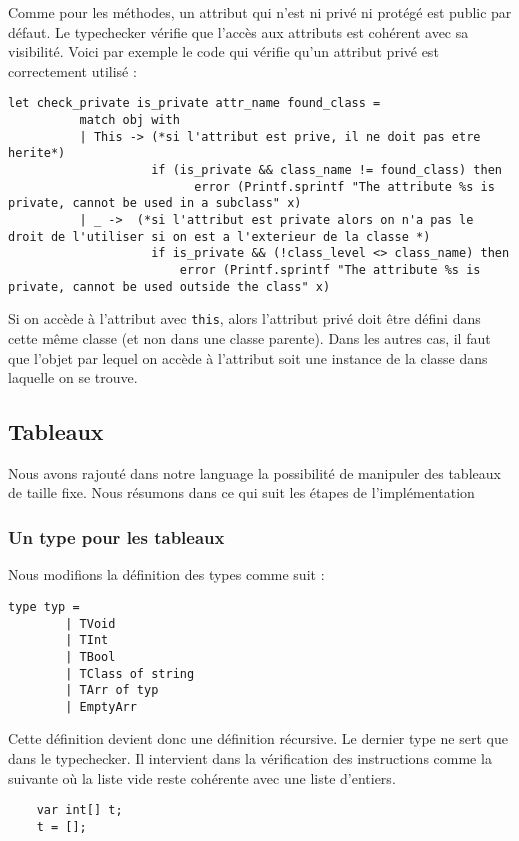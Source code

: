 \documentclass{article}
\begin{document}
Comme pour les méthodes, un attribut qui n'est ni privé ni protégé est public par défaut.
Le typechecker vérifie que l'accès aux attributs est cohérent avec sa visibilité. 
Voici par exemple le code qui vérifie qu'un attribut privé est correctement utilisé : 
\begin{lstlisting}[style=mystyle, language=caml]
    let check_private is_private attr_name found_class = 
          match obj with
          | This -> (*si l'attribut est prive, il ne doit pas etre herite*)
                    if (is_private && class_name != found_class) then 
                          error (Printf.sprintf "The attribute %s is private, cannot be used in a subclass" x)
          | _ ->  (*si l'attribut est private alors on n'a pas le droit de l'utiliser si on est a l'exterieur de la classe *)
                    if is_private && (!class_level <> class_name) then 
                        error (Printf.sprintf "The attribute %s is private, cannot be used outside the class" x)    
\end{lstlisting}
Si on accède à l'attribut avec \texttt{this}, alors l'attribut privé doit être défini dans cette même classe (et non dans une classe parente). Dans les autres cas, il faut que l'objet par lequel on accède à l'attribut soit une instance de la classe dans laquelle on se trouve. 


\subsection{Tableaux}
Nous avons rajouté dans notre language la possibilité de manipuler 
des tableaux de taille fixe. Nous résumons dans ce qui suit les étapes de l'implémentation
\subsubsection{Un type pour les tableaux} 
Nous modifions la définition des types comme suit : 
\begin{lstlisting}[style=mystyle]
    type typ =
        | TVoid
        | TInt
        | TBool
        | TClass of string
        | TArr of typ
        | EmptyArr
\end{lstlisting}
Cette définition devient donc une définition récursive.
Le dernier type ne sert que dans le typechecker.
Il intervient dans la vérification des instructions comme la suivante où 
la liste vide reste cohérente avec une liste d'entiers.
\begin{verbatim}
    var int[] t;
    t = [];
\end{verbatim}
\end{document}
